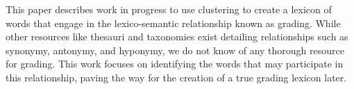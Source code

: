 This paper describes work in progress to use clustering to create a lexicon of words that engage in the lexico-semantic relationship known as grading. While other resources like thesauri and taxonomies exist detailing relationships such as synonymy, antonymy, and hyponymy, we do not know of any thorough resource for grading. This work focuses on identifying the words that may participate in this relationship, paving the way for the creation of a true grading lexicon later.

